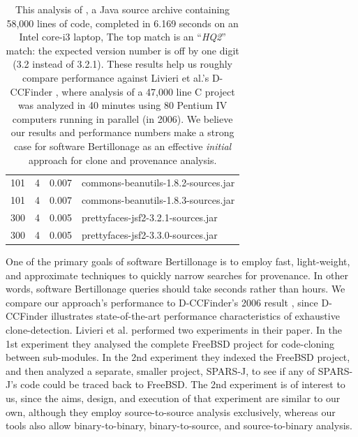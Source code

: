 \begin{table}[h]
\begin{tabular}[htbp]{r|r|r|l}
  101 &             4 &  0.007  & commons-beanutils-1.8.2-sources.jar \\
  101 &             4 &  0.007  & commons-beanutils-1.8.3-sources.jar \\
  300 &             4 &  0.005  & prettyfaces-jsf2-3.2.1-sources.jar \\
  300 &             4 &  0.005  & prettyfaces-jsf2-3.3.0-sources.jar \\
\end{tabular}
  \caption{
This analysis
of , a Java source archive
containing 58,000 lines of code, completed in
6.169 seconds on an Intel core-i3 laptop, 
The top match is an ``\emph{HQ2}'' match:
the expected version number is off by one digit (3.2 instead of 3.2.1).
These results help us roughly compare performance
against Livieri et al.'s D-CCFinder \cite{LivieriHMI07}, where
analysis of a 47,000 line C project was analyzed in 40 minutes
using 80 Pentium IV computers running in parallel (in 2006).
We believe our results and performance numbers make a strong
case for software Bertillonage as an effective \emph{initial} approach for clone and provenance
analysis.}
  \label{tab:src2src}
\end{table}




One of the primary goals of software Bertillonage is to employ fast, light-weight, and approximate
techniques to quickly narrow searches for provenance.
In other words, software Bertillonage queries should take seconds rather than hours.
We compare our approach's performance to D-CCFinder's 2006 result \cite{LivieriHMI07},
since D-CCFinder illustrates state-of-the-art performance characteristics of exhaustive
clone-detection.
Livieri et al. performed two experiments in their paper.  In the 1st experiment
they analysed the complete FreeBSD project for code-cloning between sub-modules.
In the 2nd experiment they indexed the FreeBSD project, and then analyzed a separate,
smaller project, SPARS-J, to see if any of SPARS-J's code could be traced back to FreeBSD.
The 2nd experiment is of interest to us, since the aims, design, and execution
of that experiment are similar to our own, although they employ source-to-source
analysis exclusively, whereas our tools also allow binary-to-binary, binary-to-source, and source-to-binary
analysis.

